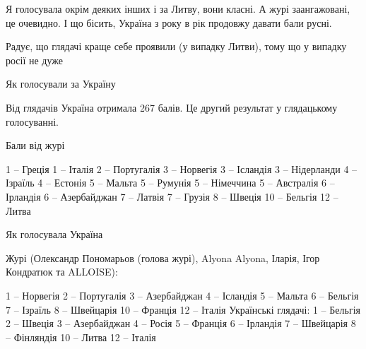 \begin{itemize}

Я голосувала окрім деяких інших і за Литву, вони класні. А журі заангажовані,
це очевидно. І що бісить, Україна з року в рік продовжу давати
бали русні.

Радує, що глядачі краще себе проявили (у випадку Литви), тому що у випадку росії не дуже


Як голосували за Україну

Від глядачів Україна отримала 267 балів. Це другий результат у глядацькому голосуванні.

Бали від журі

1 – Греція
1 – Італія
2 – Португалія
3 – Норвегія
3 – Ісландія
3 – Нідерланди
4 – Ізраїль
4 – Естонія
5 – Мальта
5 – Румунія
5 – Німеччина
5 – Австралія
6 – Ірландія
6 – Азербайджан
7 – Латвія
7 – Грузія
8 – Швеція
10 – Бельгія
12 – Литва

Як голосувала Україна

Журі (Олександр Пономарьов (голова журі), Alyona Alyona, Іларія, Ігор Кондратюк та ALLOISE):

1 – Норвегія
2 – Португалія
3 – Азербайджан
4 – Ісландія
5 – Мальта
6 – Бельгія
7 – Ізраїль
8 – Швейцарія
10 – Франція
12 – Італія
Українські глядачі:
1 – Бельгія
2 – Швеція
3 – Азербайджан
4 – Росія
5 – Франція
6 – Ірландія
7 – Швейцарія
8 – Фінляндія
10 – Литва
12 – Італія

\end{itemize}

